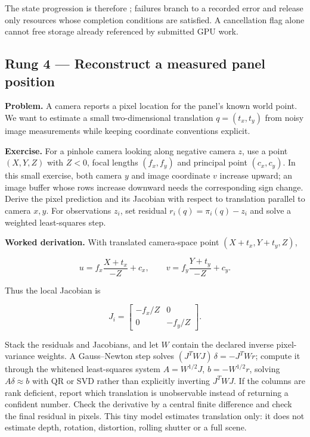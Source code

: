 The state progression is therefore ; failures branch to a recorded error and release only resources whose completion conditions are satisfied. A cancellation flag alone cannot free storage already referenced by submitted GPU work.

\subsection{Rung 4 --- Reconstruct a measured panel position}\label{02-foundations-ii-ch038-rung-4-reconstruct-a-measured-panel-position}

\hypertarget{02-foundations-ii-ch038-rung-4-reconstruct-a-measured-panel-position}{}

\textbf{Problem.} A camera reports a pixel location for the panel's known world point. We want to estimate a small two-dimensional translation \(q=(t_x,t_y)\) from noisy image measurements while keeping coordinate conventions explicit.

\textbf{Exercise.} For a pinhole camera looking along negative camera \(z\), use a point \((X,Y,Z)\) with \(Z<0\), focal lengths \((f_x,f_y)\) and principal point \((c_x,c_y)\). In this small exercise, both camera \(y\) and image coordinate \(v\) increase upward; an image buffer whose rows increase downward needs the corresponding sign change. Derive the pixel prediction and its Jacobian with respect to translation parallel to camera \(x,y\). For observations \(z_i\), set residual \(r_i(q)=\pi_i(q)-z_i\) and solve a weighted least-squares step.

\textbf{Worked derivation.} With translated camera-space point \((X+t_x,Y+t_y,Z)\),

\[
u=f_x\frac{X+t_x}{-Z}+c_x,\qquad v=f_y\frac{Y+t_y}{-Z}+c_y.
\]

Thus the local Jacobian is

\[
J_i=\begin{bmatrix}-f_x/Z&0\\0&-f_y/Z\end{bmatrix}.
\]

Stack the residuals and Jacobians, and let \(W\) contain the declared inverse pixel-variance weights. A Gauss--Newton step solves \((J^TWJ)\,\delta=-J^TWr\); compute it through the whitened least-squares system \(A=W^{1/2}J\), \(b=-W^{1/2}r\), solving \(A\delta\approx b\) with QR or SVD rather than explicitly inverting \(J^TWJ\). If the columns are rank deficient, report which translation is unobservable instead of returning a confident number. Check the derivative by a central finite difference and check the final residual in pixels. This tiny model estimates translation only: it does not estimate depth, rotation, distortion, rolling shutter or a full scene.

